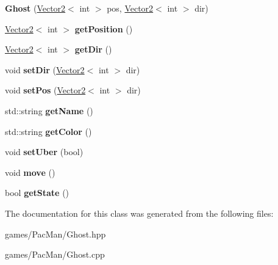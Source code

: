 \begin{DoxyCompactItemize}
\item 
\mbox{\label{class_ghost_ae0d5d21555c85c83dbbba12216a733ac}} 
{\bfseries Ghost} (\hyperlink{struct_vector2}{Vector2}$<$ int $>$ pos, \hyperlink{struct_vector2}{Vector2}$<$ int $>$ dir)
\item 
\mbox{\label{class_ghost_a193bc3ec17d7d6592349d93dfc3616ca}} 
\hyperlink{struct_vector2}{Vector2}$<$ int $>$ {\bfseries get\+Position} ()
\item 
\mbox{\label{class_ghost_a7ce810b935588136b7240c35a1f039a1}} 
\hyperlink{struct_vector2}{Vector2}$<$ int $>$ {\bfseries get\+Dir} ()
\item 
\mbox{\label{class_ghost_a4f91b2b32aab6edbbb4c76d2e0350526}} 
void {\bfseries set\+Dir} (\hyperlink{struct_vector2}{Vector2}$<$ int $>$ dir)
\item 
\mbox{\label{class_ghost_af184febbc50b03c4ca265aee4820cddc}} 
void {\bfseries set\+Pos} (\hyperlink{struct_vector2}{Vector2}$<$ int $>$ dir)
\item 
\mbox{\label{class_ghost_a6de989813477a1db9eac0fbe86327e36}} 
std\+::string {\bfseries get\+Name} ()
\item 
\mbox{\label{class_ghost_a13cb35b14f25734e6ca388d96498bd95}} 
std\+::string {\bfseries get\+Color} ()
\item 
\mbox{\label{class_ghost_aeaed1e48a841710da0a01ca01e7a5fda}} 
void {\bfseries set\+Uber} (bool)
\item 
\mbox{\label{class_ghost_a231a741f4efcc40f47bddb7efa61a19d}} 
void {\bfseries move} ()
\item 
\mbox{\label{class_ghost_a37f8ffa1a514de1cee88c16d8c2d56ed}} 
bool {\bfseries get\+State} ()
\end{DoxyCompactItemize}


The documentation for this class was generated from the following files\+:\begin{DoxyCompactItemize}
\item 
games/\+Pac\+Man/Ghost.\+hpp\item 
games/\+Pac\+Man/Ghost.\+cpp\end{DoxyCompactItemize}
